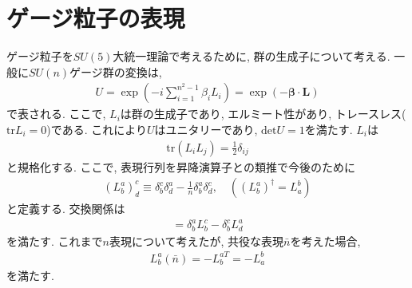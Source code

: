 \section{ゲージ粒子の表現}
ゲージ粒子を$SU(5)$大統一理論で考えるために, 群の生成子について考える.
一般に$SU(n)$ゲージ群の変換は, 
\begin{align}
  U =\exp\left(-i \sum_{i=1}^{n^2-1}\beta_i L_i\right)=\exp(-\bm{\beta}\cdot \bm{L})
\end{align}
で表される.
ここで, $L_i$は群の生成子であり, エルミート性があり, トレースレス($\mathrm{tr} L_i =0$)である.
これにより$U$はユニタリーであり, $\mathrm{det}U =1$を満たす.
$L_i$は
\begin{align}
  \mathrm{tr}(L_iL_j) = \frac{1}{2}{\delta_{ij}}\label{reguralization}
\end{align}
と規格化する.
ここで, 表現行列を昇降演算子との類推で今後のために
\begin{align}
  (L^a_b)^c_d \equiv \delta^c_b\delta^a_d -\frac{1}{n}\delta^a_b\delta^c_d,\quad ((L^a_b)^\dagger=L^b_a)
\end{align}
と定義する.
交換関係は
\begin{align}
  [L^a_b,L^c_d] = \delta^a_bL^c_b - \delta^c_bL^a_d
\end{align}
を満たす.
これまで$n$表現について考えたが, 共役な表現$\bar{n}$を考えた場合,
\begin{align}
  L^a_b(\bar{n}) = -L^{aT}_b = -L^b_a
\end{align}
を満たす.

